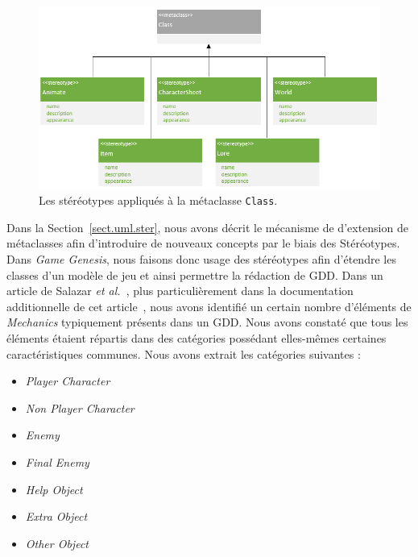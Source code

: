 \begin{figure}[H]
    \centering
    \includegraphics[width=\linewidth]{10_img/chap5/metaclass_class.PNG} 
    \caption{Les stéréotypes appliqués à la m\'etaclasse \texttt{Class}.}
    \label{fig.meta_class}
\end{figure}


Dans la Section~\ref{sect.uml.ster}, nous avons décrit le mécanisme de d'extension de m\'etaclasses afin d'introduire de nouveaux concepts par le biais des Stéréotypes. 
Dans \emph{Game Genesis}, nous faisons donc usage des stéréotypes afin d'étendre les classes d'un modèle de jeu et ainsi permettre la rédaction de GDD.
Dans un article de Salazar \emph{et al.}~\cite{GDD_software}, plus particulièrement dans la documentation additionnelle de cet article~\cite{salazar_gdd}, nous avons identifié un certain nombre d'\'el\'ements de \emph{Mechanics} typiquement présents dans un GDD.
Nous avons constaté que tous les éléments étaient répartis dans des catégories possédant elles-mêmes certaines caractéristiques communes. 
Nous avons extrait les catégories suivantes :

\begin{itemize}
    \item \emph{Player Character}
    \item \emph{Non Player Character}
    \item \emph{Enemy}
    \item \emph{Final Enemy}
    \item \emph{Help Object}
    \item \emph{Extra Object}
    \item \emph{Other Object}
\end{itemize}



